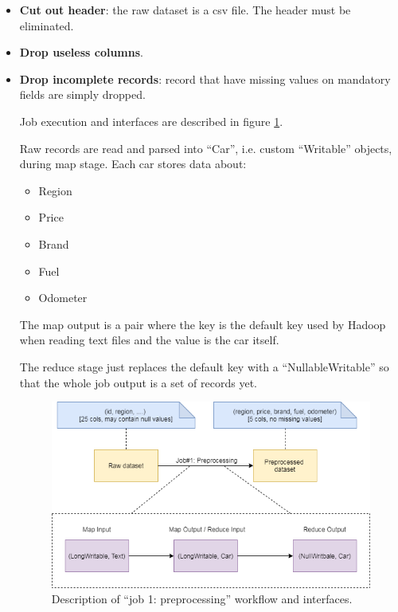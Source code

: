 \begin{itemize}

  \item \textbf{Cut out header}: the raw dataset is a csv file. The header must be eliminated.
  \item \textbf{Drop useless columns}.
  \item \textbf{Drop incomplete records}: record that have missing values on mandatory fields are simply dropped. 

Job execution and interfaces are described in figure \ref{fig:MR-job-1}.
 
Raw records are read and parsed into ``Car'', i.e. custom ``Writable'' objects, during map stage. 
Each car stores data about:
\begin{itemize}
 \item Region
 \item Price
 \item Brand
 \item Fuel
 \item Odometer
\end{itemize}

The map output is a pair where the key is the default key used by Hadoop when reading text files and the value is the car itself.

The reduce stage just replaces the default key with a ``NullableWritable'' so that the whole job output is a set of records yet.

\begin{figure}[H]
	\centering
	\includegraphics[scale=0.7]{images/2-mapreduce/MR-job-1.png}
	\caption{Description of ``job 1: preprocessing'' workflow and interfaces.}
	\label{fig:MR-job-1}
\end{figure}




\end{itemize}

